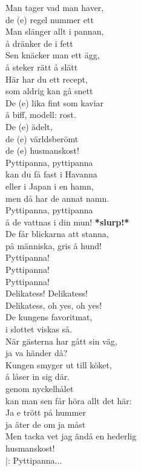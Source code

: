 \documentclass[12pt]{article}
\begin{document}
\hspace{0.075\textwidth}
\noindent
\begin{minipage}{.45\textwidth}
	\noindent
	Man tager vad man haver,\\
	de (e) regel nummer ett\\
	Man slänger allt i pannan,\\
	å dränker de i fett\\
	Sen knäcker man ett ägg,\\
	å steker rätt å slätt\\
	Här har du ett recept,\\
	som aldrig kan gå snett\\
	
	\noindent
	De (e) lika fint som kaviar\\
	å biff, modell: rost.\\
	De (e) ädelt,\\
	de (e) världsberömt\\
	de (e) husmanskost!\\
	
	\noindent
	Pyttipanna, pyttipanna\\
	kan du få fast i Havanna\\
	eller i Japan i en hamn,\\
	men då har de annat namn.\\
	Pyttipanna, pyttipanna\\
	å de vattnas i din mun! \textbf{\small{*slurp!*}}\\
	De får blickarna att stanna,\\
	på människa, gris å hund!\\
	Pyttipanna!\\
	Pyttipanna!\\
	Pyttipanna!\\
	Delikatess! Delikatess!\\
	Delikatess, oh yes, oh yes!\\
	
	\noindent
	De kungens favoritmat,\\
	i slottet viskas så.\\
	När gästerna har gått sin väg,\\
	ja va händer då?\\
	Kungen smyger ut till köket,\\
	å låser in sig där.\\
	genom nyckelhålet\\
	kan man sen får höra allt det här:\\
	
	\noindent
	Ja e trött på hummer\\
	ja äter de om ja måst\\
	Men tacka vet jag ändå en hederlig\\
	husmanskost!\\
	
	\noindent
	|: Pyttipanna...
	\vspace{1cm}

\end{minipage}
\end{document}

